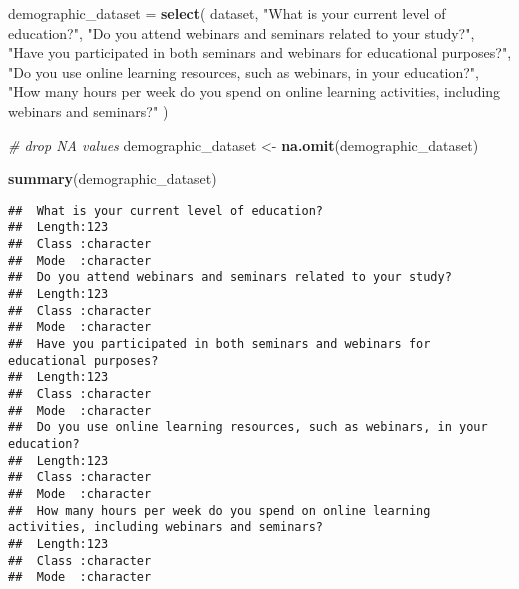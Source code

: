 \documentclass[
]{article}
\newenvironment{Shaded}{\begin{snugshade}}{\end{snugshade}}
\newcommand{\CommentTok}[1]{\textcolor[rgb]{0.56,0.35,0.01}{\textit{#1}}}
\newcommand{\FunctionTok}[1]{\textcolor[rgb]{0.13,0.29,0.53}{\textbf{#1}}}
\newcommand{\NormalTok}[1]{#1}
\newcommand{\OtherTok}[1]{\textcolor[rgb]{0.56,0.35,0.01}{#1}}
\newcommand{\StringTok}[1]{\textcolor[rgb]{0.31,0.60,0.02}{#1}}
\begin{document}
\begin{Shaded}
\begin{Highlighting}[]
\NormalTok{demographic\_dataset }\OtherTok{=} \FunctionTok{select}\NormalTok{(}
\NormalTok{    dataset,}
    \StringTok{"What is your current level of education?"}\NormalTok{,}
    \StringTok{"Do you attend webinars and seminars related to your study?"}\NormalTok{,}
    \StringTok{"Have you participated in both seminars and webinars for educational purposes?"}\NormalTok{,}
    \StringTok{"Do you use online learning resources, such as webinars, in your education?"}\NormalTok{,}
    \StringTok{"How many hours per week do you spend on online learning activities, including webinars and seminars?"}
\NormalTok{)}

\CommentTok{\# drop NA values}
\NormalTok{demographic\_dataset }\OtherTok{\textless{}{-}} \FunctionTok{na.omit}\NormalTok{(demographic\_dataset)}

\FunctionTok{summary}\NormalTok{(demographic\_dataset)}
\end{Highlighting}
\end{Shaded}

\begin{verbatim}
##  What is your current level of education?
##  Length:123                              
##  Class :character                        
##  Mode  :character                        
##  Do you attend webinars and seminars related to your study?
##  Length:123                                                
##  Class :character                                          
##  Mode  :character                                          
##  Have you participated in both seminars and webinars for educational purposes?
##  Length:123                                                                   
##  Class :character                                                             
##  Mode  :character                                                             
##  Do you use online learning resources, such as webinars, in your education?
##  Length:123                                                                
##  Class :character                                                          
##  Mode  :character                                                          
##  How many hours per week do you spend on online learning activities, including webinars and seminars?
##  Length:123                                                                                          
##  Class :character                                                                                    
##  Mode  :character
\end{verbatim}
\end{document}
